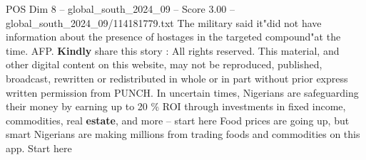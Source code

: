 \begin{textsample}{POS Dim 8 – global\_south\_2024\_09 – Score 3.00 – global\_south\_2024\_09/114181779.txt}
The military said it"did not have information about the presence of hostages in the targeted compound"at the time.
AFP. \textbf{Kindly} share this story : All rights reserved.
This material, and other digital content on this website, may not be reproduced, published, broadcast, rewritten or redistributed in whole or in part without prior express written permission from PUNCH.
In uncertain times, Nigerians are safeguarding their money by earning up to 20 \% ROI through investments in fixed income, commodities, real \textbf{estate}, and more -- start here Food prices are going up, but smart Nigerians are making millions from trading foods and commodities on this app.
Start here

\end{textsample}
